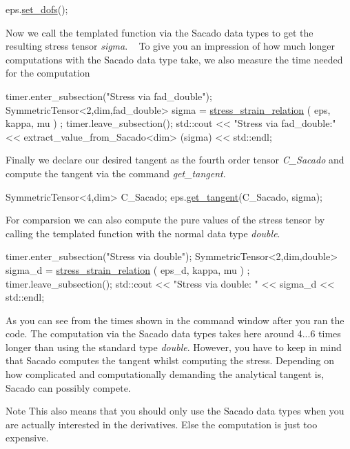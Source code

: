 \begin{DoxyCode}
eps.\hyperlink{classSacado__Wrapper_1_1SymTensor_aa9e0fcc9d4e0a4120bedb8ef9b8d7ecb}{set\_dofs}();
\end{DoxyCode}
 Now we call the templated function via the Sacado data types to get the resulting stress tensor {\itshape sigma}. ~\newline
To give you an impression of how much longer computations with the Sacado data type take, we also measure the time needed for the computation 
\begin{DoxyCode}
timer.enter\_subsection(\textcolor{stringliteral}{"Stress via fad\_double"});
  SymmetricTensor<2,dim,fad\_double> sigma = \hyperlink{Sacado__example_8cc_ae6e87a9cc06bd452cb5a1bfec2245569}{stress\_strain\_relation} ( eps, kappa, mu )
      ;
timer.leave\_subsection();
std::cout << \textcolor{stringliteral}{"Stress via fad\_double:"} << extract\_value\_from\_Sacado<dim> (sigma) << std::endl;
\end{DoxyCode}
 Finally we declare our desired tangent as the fourth order tensor {\itshape C\+\_\+\+Sacado} and compute the tangent via the command {\itshape get\+\_\+tangent}. 
\begin{DoxyCode}
SymmetricTensor<4,dim> C\_Sacado;
eps.\hyperlink{classSacado__Wrapper_1_1SymTensor_ab97427c3b5cab279e58607cf431ab262}{get\_tangent}(C\_Sacado, sigma);
\end{DoxyCode}
 For comparsion we can also compute the pure values of the stress tensor by calling the templated function with the normal data type {\itshape double}. 
\begin{DoxyCode}
timer.enter\_subsection(\textcolor{stringliteral}{"Stress via double"});
  SymmetricTensor<2,dim,double> sigma\_d = \hyperlink{Sacado__example_8cc_ae6e87a9cc06bd452cb5a1bfec2245569}{stress\_strain\_relation} ( eps\_d, kappa, mu )
      ;
timer.leave\_subsection();
std::cout << \textcolor{stringliteral}{"Stress via double:    "} << sigma\_d << std::endl;
\end{DoxyCode}
 As you can see from the times shown in the command window after you ran the code. The computation via the Sacado data types takes here around 4...6 times longer than using the standard type {\itshape double}. However, you have to keep in mind that Sacado computes the tangent whilst computing the stress. Depending on how complicated and computationally demanding the analytical tangent is, Sacado can possibly compete.

\begin{DoxyNote}{Note}
This also means that you should only use the Sacado data types when you are actually interested in the derivatives. Else the computation is just too expensive.
\end{DoxyNote}

